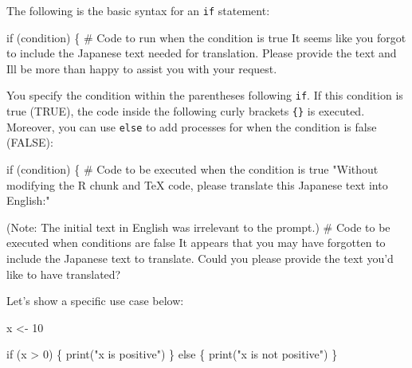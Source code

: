 \documentclass[
  a4paper,
]{book}
\newenvironment{Shaded}{\begin{snugshade}}{\end{snugshade}}
\newcommand{\CommentTok}[1]{\textcolor[rgb]{0.37,0.37,0.37}{#1}}
\newcommand{\ControlFlowTok}[1]{\textcolor[rgb]{0.00,0.23,0.31}{#1}}
\newcommand{\DecValTok}[1]{\textcolor[rgb]{0.68,0.00,0.00}{#1}}
\newcommand{\FunctionTok}[1]{\textcolor[rgb]{0.28,0.35,0.67}{#1}}
\newcommand{\NormalTok}[1]{\textcolor[rgb]{0.00,0.23,0.31}{#1}}
\newcommand{\OtherTok}[1]{\textcolor[rgb]{0.00,0.23,0.31}{#1}}
\newcommand{\SpecialCharTok}[1]{\textcolor[rgb]{0.37,0.37,0.37}{#1}}
\newcommand{\StringTok}[1]{\textcolor[rgb]{0.13,0.47,0.30}{#1}}
\begin{document}
The following is the basic syntax for an \texttt{if} statement:

\begin{Shaded}
\begin{Highlighting}[]
\ControlFlowTok{if}\NormalTok{ (condition) \{}
    \CommentTok{\# Code to run when the condition is true}
\NormalTok{It seems like you forgot to include the Japanese text needed }\ControlFlowTok{for}\NormalTok{ translation. Please provide the text and I}\StringTok{\textquotesingle{}ll be more than happy to assist you with your request.}
\end{Highlighting}
\end{Shaded}

You specify the condition within the parentheses following \texttt{if}.
If this condition is true (TRUE), the code inside the following curly
brackets \texttt{\{\}} is executed. Moreover, you can use \texttt{else}
to add processes for when the condition is false (FALSE):

\begin{Shaded}
\begin{Highlighting}[]
\ControlFlowTok{if}\NormalTok{ (condition) \{}
    \CommentTok{\# Code to be executed when the condition is true}
\StringTok{"Without modifying the R chunk and TeX code, please translate this Japanese text into English:"}

\NormalTok{(Note}\SpecialCharTok{:}\NormalTok{ The initial text }\ControlFlowTok{in}\NormalTok{ English was irrelevant to the prompt.)}
    \CommentTok{\# Code to be executed when conditions are false}
\NormalTok{It appears that you may have forgotten to include the Japanese text to translate. Could you please provide the text you’d like to have translated?}
\end{Highlighting}
\end{Shaded}

Let's show a specific use case below:

\begin{Shaded}
\begin{Highlighting}[]
\NormalTok{x }\OtherTok{\textless{}{-}} \DecValTok{10}

\ControlFlowTok{if}\NormalTok{ (x }\SpecialCharTok{\textgreater{}} \DecValTok{0}\NormalTok{) \{}
  \FunctionTok{print}\NormalTok{(}\StringTok{"x is positive"}\NormalTok{)}
\NormalTok{\} }\ControlFlowTok{else}\NormalTok{ \{}
  \FunctionTok{print}\NormalTok{(}\StringTok{"x is not positive"}\NormalTok{)}
\NormalTok{\}}
\end{Highlighting}
\end{Shaded}
\end{document}
